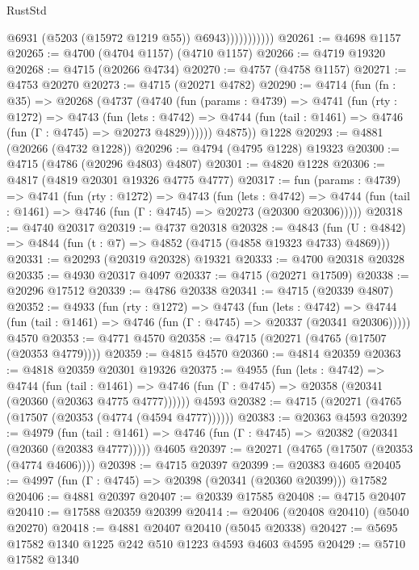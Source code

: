 \begin{lexlean}{RustStd}
\begin{coremodule}
                          @6931
                          (@5203 (@15972 @1219 @55))
                          @6943)))))))))))
@20261 := @4698 @1157
@20265 := @4700 (@4704 @1157) (@4710 @1157)
@20266 := @4719 @19320
@20268 := @4715 (@20266 @4734)
@20270 := @4757 (@4758 @1157)
@20271 := @4753 @20270
@20273 := @4715 (@20271 @4782)
@20290 := @4714
    (fun (fn : @35) =>
    @20268
      (@4737
        (@4740
          (fun (params : @4739) =>
          @4741
            (fun (rty : @1272) =>
            @4743
              (fun (lets : @4742) =>
              @4744 (fun (tail : @1461) => @4746 (fun (Γ : @4745) => @20273 @4829))))))
        @4875))
    @1228
@20293 := @4881 (@20266 (@4732 @1228))
@20296 := @4794 (@4795 @1228) @19323
@20300 := @4715 (@4786 (@20296 @4803) @4807)
@20301 := @4820 @1228
@20306 := @4817 (@4819 @20301 @19326 @4775 @4777)
@20317 := fun (params : @4739) =>
  @4741
    (fun (rty : @1272) =>
    @4743
      (fun (lets : @4742) =>
      @4744 (fun (tail : @1461) => @4746 (fun (Γ : @4745) => @20273 (@20300 @20306)))))
@20318 := @4740 @20317
@20319 := @4737 @20318
@20328 := @4843
    (fun (U : @4842) => @4844 (fun (t : @7) => @4852 (@4715 (@4858 @19323 @4733) @4869)))
@20331 := @20293 (@20319 @20328) @19321
@20333 := @4700 @20318 @20328
@20335 := @4930 @20317 @4097
@20337 := @4715 (@20271 @17509)
@20338 := @20296 @17512
@20339 := @4786 @20338
@20341 := @4715 (@20339 @4807)
@20352 := @4933
    (fun (rty : @1272) =>
    @4743
      (fun (lets : @4742) =>
      @4744 (fun (tail : @1461) => @4746 (fun (Γ : @4745) => @20337 (@20341 @20306)))))
    @4570
@20353 := @4771 @4570
@20358 := @4715 (@20271 (@4765 (@17507 (@20353 @4779))))
@20359 := @4815 @4570
@20360 := @4814 @20359
@20363 := @4818 @20359 @20301 @19326
@20375 := @4955
    (fun (lets : @4742) =>
    @4744
      (fun (tail : @1461) =>
      @4746 (fun (Γ : @4745) => @20358 (@20341 (@20360 (@20363 @4775 @4777))))))
    @4593
@20382 := @4715 (@20271 (@4765 (@17507 (@20353 (@4774 (@4594 @4777))))))
@20383 := @20363 @4593
@20392 := @4979
    (fun (tail : @1461) => @4746 (fun (Γ : @4745) => @20382 (@20341 (@20360 (@20383 @4777)))))
    @4605
@20397 := @20271 (@4765 (@17507 (@20353 (@4774 @4606))))
@20398 := @4715 @20397
@20399 := @20383 @4605
@20405 := @4997 (fun (Γ : @4745) => @20398 (@20341 (@20360 @20399))) @17582
@20406 := @4881 @20397
@20407 := @20339 @17585
@20408 := @4715 @20407
@20410 := @17588 @20359 @20399
@20414 := @20406 (@20408 @20410) (@5040 @20270)
@20418 := @4881 @20407 @20410 (@5045 @20338)
@20427 := @5695 @17582 @1340 @1225 @242 @510 @1223 @4593 @4603 @4595
@20429 := @5710 @17582 @1340

\end{coremodule}
\end{lexlean}
